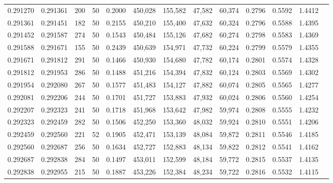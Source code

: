 \begin{tabular}{rrrrrrrrrrrrr}
0.291270 & 0.291361 &   200 &  50 &                                     0.2000 & 450,028 & 155,582 &  47,582 &  60,374 & 0.2796 & 0.5592 & 1.4412 \\
0.291361 & 0.291451 &   182 &  50 &                                     0.2155 & 450,210 & 155,400 &  47,632 &  60,324 & 0.2796 & 0.5588 & 1.4395 \\
0.291452 & 0.291587 &   274 &  50 &                                     0.1543 & 450,484 & 155,126 &  47,682 &  60,274 & 0.2798 & 0.5583 & 1.4369 \\
0.291588 & 0.291671 &   155 &  50 &                                     0.2439 & 450,639 & 154,971 &  47,732 &  60,224 & 0.2799 & 0.5579 & 1.4355 \\
0.291671 & 0.291812 &   291 &  50 &                                     0.1466 & 450,930 & 154,680 &  47,782 &  60,174 & 0.2801 & 0.5574 & 1.4328 \\
0.291812 & 0.291953 &   286 &  50 &                                     0.1488 & 451,216 & 154,394 &  47,832 &  60,124 & 0.2803 & 0.5569 & 1.4302 \\
0.291954 & 0.292080 &   267 &  50 &                                     0.1577 & 451,483 & 154,127 &  47,882 &  60,074 & 0.2805 & 0.5565 & 1.4277 \\
0.292081 & 0.292206 &   244 &  50 &                                     0.1701 & 451,727 & 153,883 &  47,932 &  60,024 & 0.2806 & 0.5560 & 1.4254 \\
0.292207 & 0.292323 &   241 &  50 &                                     0.1718 & 451,968 & 153,642 &  47,982 &  59,974 & 0.2808 & 0.5555 & 1.4232 \\
0.292323 & 0.292459 &   282 &  50 &                                     0.1506 & 452,250 & 153,360 &  48,032 &  59,924 & 0.2810 & 0.5551 & 1.4206 \\
0.292459 & 0.292560 &   221 &  52 &                                     0.1905 & 452,471 & 153,139 &  48,084 &  59,872 & 0.2811 & 0.5546 & 1.4185 \\
0.292560 & 0.292687 &   256 &  50 &                                     0.1634 & 452,727 & 152,883 &  48,134 &  59,822 & 0.2812 & 0.5541 & 1.4162 \\
0.292687 & 0.292838 &   284 &  50 &                                     0.1497 & 453,011 & 152,599 &  48,184 &  59,772 & 0.2815 & 0.5537 & 1.4135 \\
0.292838 & 0.292955 &   215 &  50 &                                     0.1887 & 453,226 & 152,384 &  48,234 &  59,722 & 0.2816 & 0.5532 & 1.4115 \\

\end{tabular}
